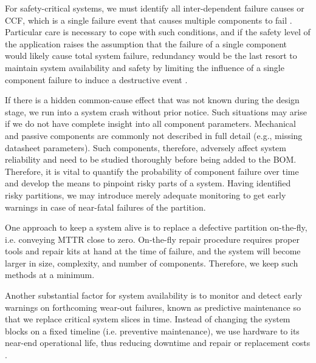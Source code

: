 For safety-critical systems, we must identify all inter-dependent
failure causes or \ac{CCF}, which is a single failure event that
causes multiple components to fail \autocite{Belland}.
Particular care is necessary to cope with such conditions, and if the safety
level of the application raises the assumption that the failure of a single
component would likely cause total system failure, redundancy would be the
last resort to maintain system availability and safety by limiting the influence
of a single component failure to induce a destructive event \autocite{NUREG}.

If there is a hidden common-cause effect that was not known during the design
stage, we run into a system crash without prior notice.
Such situations may arise if we do not have complete insight into all component
parameters.
Mechanical and passive components are commonly not described in full detail
(e.g., missing datasheet parameters).
Such components, therefore, adversely affect system reliability and need to be
studied thoroughly before being added to the \ac{BOM}.
Therefore, it is vital to quantify the probability of component failure
over time and develop the means to pinpoint risky parts of a system.
Having identified risky partitions, we may introduce merely adequate monitoring
to get early warnings in case of near-fatal failures of the partition.

One approach to keep a system alive is to replace a defective partition
on-the-fly, i.e. conveying \ac{MTTR} close to zero.
On-the-fly repair procedure requires proper tools and repair kits at hand at the time
of failure, and the system will become larger in size, complexity, and number
of components.
Therefore, we keep such methods at a minimum.

Another substantial factor for system availability is to monitor and detect
early warnings on forthcoming wear-out failures, known as predictive maintenance
so that we replace critical system slices in time. Instead of changing the system
blocks on a fixed timeline (i.e. preventive maintenance), we use hardware to
its near-end operational life, thus reducing downtime and repair or replacement
costs \autocite{womack}.